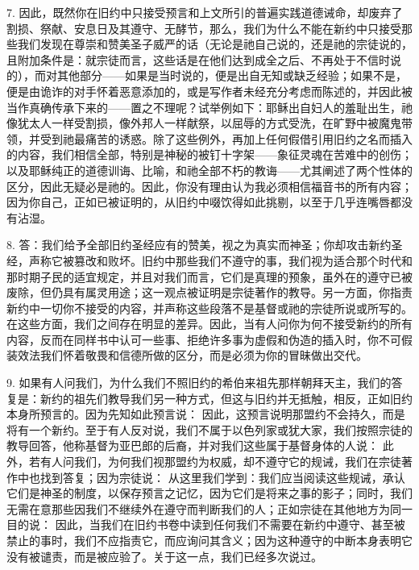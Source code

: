7. 因此，既然你在旧约中只接受预言和上文所引的普遍实践道德诫命，却废弃了割损、祭献、安息日及其遵守、无酵节，那么，我们为什么不能在新约中只接受那些我们发现在尊崇和赞美圣子威严的话（无论是祂自己说的，还是祂的宗徒说的，且附加条件是：就宗徒而言，这些话是在他们达到成全之后、不再处于不信时说的），而对其他部分——如果是当时说的，便是出自无知或缺乏经验；如果不是，便是由诡诈的对手怀着恶意添加的，或是写作者未经充分考虑而陈述的，并因此被当作真确传承下来的——置之不理呢？试举例如下：耶稣出自妇人的羞耻出生，祂像犹太人一样受割损，像外邦人一样献祭，以屈辱的方式受洗，在旷野中被魔鬼带领，并受到祂最痛苦的诱惑。除了这些例外，再加上任何假借引用旧约之名而插入的内容，我们相信全部，特别是神秘的被钉十字架——象征灵魂在苦难中的创伤；以及耶稣纯正的道德训诲、比喻，和祂全部不朽的教诲——尤其阐述了两个性体的区分，因此无疑必是祂的。因此，你没有理由认为我必须相信福音书的所有内容；因为你自己，正如已被证明的，从旧约中啜饮得如此挑剔，以至于几乎连嘴唇都没有沾湿。\par

8. 答：我们给予全部旧约圣经应有的赞美，视之为真实而神圣；你却攻击新约圣经，声称它被篡改和败坏。旧约中那些我们不遵守的事，我们视为适合那个时代和那时期子民的适宜规定，并且对我们而言，它们是真理的预象，虽外在的遵守已被废除，但仍具有属灵用途；这一观点被证明是宗徒著作的教导。另一方面，你指责新约中一切你不接受的内容，并声称这些段落不是基督或祂的宗徒所说或所写的。在这些方面，我们之间存在明显的差异。因此，当有人问你为何不接受新约的所有内容，反而在同样书中认可一些事、拒绝许多事为虚假和伪造的插入时，你不可假装效法我们怀着敬畏和信德所做的区分，而是必须为你的冒昧做出交代。\par

9. 如果有人问我们，为什么我们不照旧约的希伯来祖先那样朝拜天主，我们的答复是：新约的祖先们教导我们另一种方式，但这与旧约并无抵触，相反，正如旧约本身所预言的。因为先知如此预言说： 因此，这预言说明那盟约不会持久，而是将有一个新约。至于有人反对说，我们不属于以色列家或犹大家，我们按照宗徒的教导回答，他称基督为亚巴郎的后裔，并对我们这些属于基督身体的人说： 此外，若有人问我们，为何我们视那盟约为权威，却不遵守它的规诫，我们在宗徒著作中也找到答复；因为宗徒说： 从这里我们学到：我们应当阅读这些规诫，承认它们是神圣的制度，以保存预言之记忆，因为它们是将来之事的影子；同时，我们无需在意那些因我们不继续外在遵守而判断我们的人；正如宗徒在其他地方为同一目的说： 因此，当我们在旧约书卷中读到任何我们不需要在新约中遵守、甚至被禁止的事时，我们不应指责它，而应询问其含义；因为这种遵守的中断本身表明它没有被谴责，而是被应验了。关于这一点，我们已经多次说过。\par


